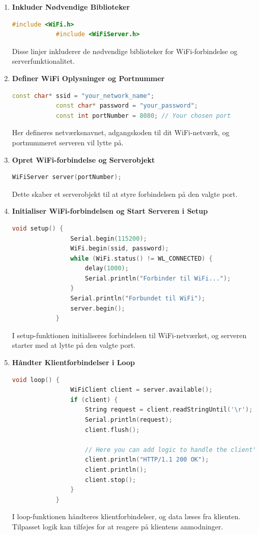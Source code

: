 \documentclass[12pt,a4paper]{book}
\begin{document}
	\begin{enumerate}
		\item \textbf{Inkluder Nødvendige Biblioteker}
		\begin{lstlisting}[language=C++, caption=Syntaks]
			#include <WiFi.h>
			#include <WiFiServer.h>
		\end{lstlisting}
		Disse linjer inkluderer de nødvendige biblioteker for WiFi-forbindelse og serverfunktionalitet.
		
		\item \textbf{Definer WiFi Oplysninger og Portnummer}
		\begin{lstlisting}[language=C++, caption=Syntaks]
			const char* ssid = "your_network_name";
			const char* password = "your_password";
			const int portNumber = 8080; // Your chosen port
		\end{lstlisting}
		Her defineres netværksnavnet, adgangskoden til dit WiFi-netværk, og portnummeret serveren vil lytte på.
		
		\item \textbf{Opret WiFi-forbindelse og Serverobjekt}
		\begin{lstlisting}[language=C++, caption=Syntaks]
			WiFiServer server(portNumber);
		\end{lstlisting}
		Dette skaber et serverobjekt til at styre forbindelsen på den valgte port.
		
		\item \textbf{Initialiser WiFi-forbindelsen og Start Serveren i Setup}
		\begin{lstlisting}[language=C++, caption=Syntaks]
			void setup() {
				Serial.begin(115200);
				WiFi.begin(ssid, password);
				while (WiFi.status() != WL_CONNECTED) {
					delay(1000);
					Serial.println("Forbinder til WiFi...");
				}
				Serial.println("Forbundet til WiFi");
				server.begin();
			}
		\end{lstlisting}
		I setup-funktionen initialiseres forbindelsen til WiFi-netværket, og serveren starter med at lytte på den valgte port.
		
		\item \textbf{Håndter Klientforbindelser i Loop}
		\begin{lstlisting}[language=C++, caption=Syntaks]
			void loop() {
				WiFiClient client = server.available();
				if (client) {
					String request = client.readStringUntil('\r');
					Serial.println(request);
					client.flush();
					
					// Here you can add logic to handle the client's request
					client.println("HTTP/1.1 200 OK");
					client.println();
					client.stop();
				}
			}
		\end{lstlisting}
		I loop-funktionen håndteres klientforbindelser, og data læses fra klienten. Tilpasset logik kan tilføjes for at reagere på klientens anmodninger.
	\end{enumerate}
	
\end{document}

